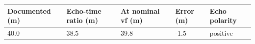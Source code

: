 \begin{tabular}{lllll}
\toprule
Documented (m) & Echo-time ratio (m) & At nominal vf (m) & Error (m) & Echo polarity \\
\midrule
40.0 & 38.5 & 39.8 & -1.5 & positive \\
\bottomrule
\end{tabular}
